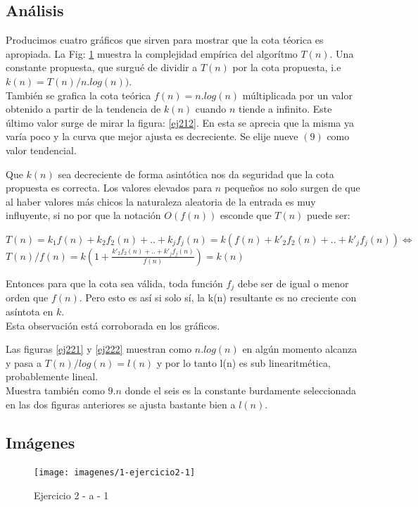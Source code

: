 \documentclass[11pt,a4paper]{article}
\newcommand{\sisosi}{\Leftrightarrow}
\newcommand{\bc}{\begin{center}}
\newcommand{\ec}{\end{center}}
\begin{document}
\subsection*{Análisis}

Producimos cuatro gráficos que sirven para mostrar que la cota téorica es apropiada.
La Fig: \ref{ej211} muestra la complejidad empírica del algorítmo $T(n)$. 
Una constante propuesta, que surgué de dividir a $T(n)$ por la cota propuesta, i.e $k(n) = T(n) / n.log(n) ) $. \\
También se grafica la cota teórica $f(n) = n.log(n)$ múltiplicada por un valor obtenido a partir de la tendencia de $k(n)$ cuando $n$ tiende a infinito. 
Este último valor surge de mirar la figura: \ref{ej212}.
En esta se aprecia que la misma ya varía poco y la curva que mejor ajusta es decreciente. 
Se elije nueve $(9)$ como valor tendencial.

Que $k(n)$ sea decreciente de forma asintótica nos da seguridad que la cota propuesta es correcta. Los valores elevados para $n$ pequeños no solo surgen de que al haber valores más chicos la naturaleza aleatoria de la entrada es muy influyente, si no por que la notación $O(f(n))$ esconde que $T(n)$ puede ser:

\bc
$T(n) = k_1f(n) + k_2 f_2(n) + .. + k_j f_j(n) = k( f(n) + k'_2f_2(n) + .. + k'_jf_j(n)) \sisosi$\\
$T(n) / f(n) = k ( 1 + \frac{k'_2f_2(n) + .. + k'_jf_j(n)}{f(n)}) = k(n)$ 
\ec

Entonces para que la cota sea válida, toda función $f_j$ debe ser de igual o menor orden que $f(n)$. Pero esto es así si solo sí, la k(n) resultante es no creciente con asíntota en $k$. \\
Esta observación está corroborada en los gráficos.

Las figuras \ref{ej221} y \ref{ej222} muestran como $n.log(n)$ en algún momento alcanza y pasa a $T(n) / log(n) = l(n)$ y por lo tanto l(n) es sub linearitmética, probablemente lineal. \\
Muestra también como $9.n$ donde el seis es la constante burdamente seleccionada en las dos figuras anteriores se ajusta bastante bien a $l(n)$.


\subsection*{Imágenes}

    	\begin{center}
          \begin{figure}[H]
                \caption{Ejercicio 2 - a - 1}
        	\texttt{[image: imagenes/1-ejercicio2-1]}
                \label{ej211}
          \end{figure}
    	\end{center}
\end{document}
